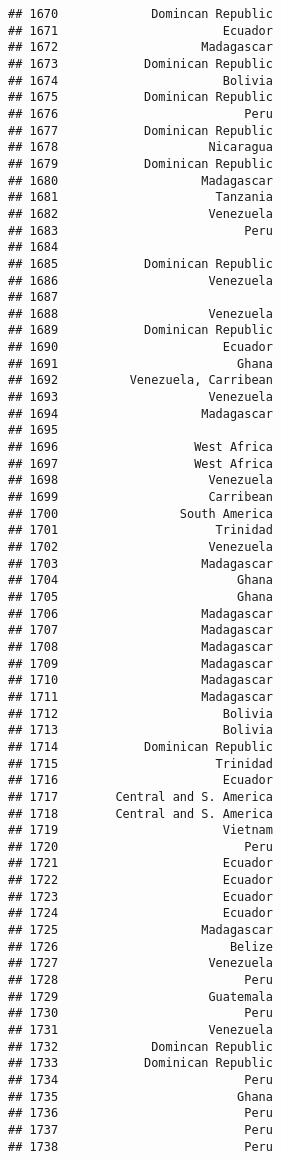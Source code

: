 \documentclass[
]{article}
\begin{document}
\begin{verbatim}
## 1670             Domincan Republic
## 1671                       Ecuador
## 1672                    Madagascar
## 1673            Dominican Republic
## 1674                       Bolivia
## 1675            Dominican Republic
## 1676                          Peru
## 1677            Dominican Republic
## 1678                     Nicaragua
## 1679            Dominican Republic
## 1680                    Madagascar
## 1681                      Tanzania
## 1682                     Venezuela
## 1683                          Peru
## 1684                              
## 1685            Dominican Republic
## 1686                     Venezuela
## 1687                              
## 1688                     Venezuela
## 1689            Dominican Republic
## 1690                       Ecuador
## 1691                         Ghana
## 1692          Venezuela, Carribean
## 1693                     Venezuela
## 1694                    Madagascar
## 1695                              
## 1696                   West Africa
## 1697                   West Africa
## 1698                     Venezuela
## 1699                     Carribean
## 1700                 South America
## 1701                      Trinidad
## 1702                     Venezuela
## 1703                    Madagascar
## 1704                         Ghana
## 1705                         Ghana
## 1706                    Madagascar
## 1707                    Madagascar
## 1708                    Madagascar
## 1709                    Madagascar
## 1710                    Madagascar
## 1711                    Madagascar
## 1712                       Bolivia
## 1713                       Bolivia
## 1714            Dominican Republic
## 1715                      Trinidad
## 1716                       Ecuador
## 1717        Central and S. America
## 1718        Central and S. America
## 1719                       Vietnam
## 1720                          Peru
## 1721                       Ecuador
## 1722                       Ecuador
## 1723                       Ecuador
## 1724                       Ecuador
## 1725                    Madagascar
## 1726                        Belize
## 1727                     Venezuela
## 1728                          Peru
## 1729                     Guatemala
## 1730                          Peru
## 1731                     Venezuela
## 1732             Domincan Republic
## 1733            Dominican Republic
## 1734                          Peru
## 1735                         Ghana
## 1736                          Peru
## 1737                          Peru
## 1738                          Peru

\end{verbatim}
\end{document}

